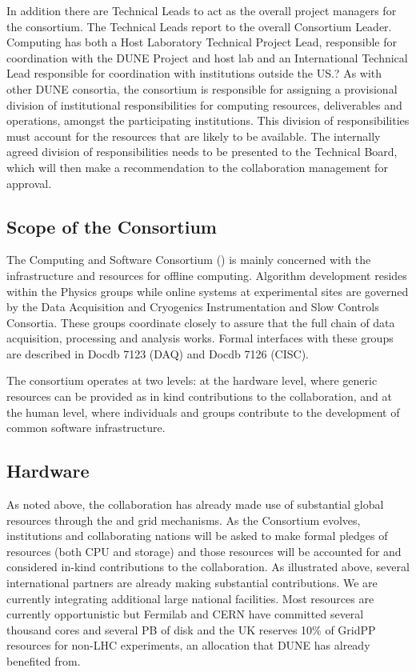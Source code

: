   In addition there  are Technical Leads to act as the overall project managers for the consortium. The Technical Leads report to the overall Consortium Leader.
  Computing has both a Host Laboratory Technical Project Lead, responsible for coordination with the DUNE Project and host lab and an International Technical Lead responsible for coordination with institutions outside the US.?
  As with other DUNE consortia, the consortium is responsible for assigning a provisional division of institutional
  responsibilities for computing resources, deliverables and operations, amongst the participating institutions. This division of responsibilities must account for the resources that are likely to be available. The internally agreed division of responsibilities needs to be presented to the Technical Board, which will then make a recommendation to the collaboration management for approval.



  \subsection{Scope of the Consortium}
  The Computing and Software Consortium () is mainly concerned with the infrastructure and resources for offline computing.  Algorithm development resides within the Physics groups while online systems at experimental sites are governed by the Data Acquisition and Cryogenics Instrumentation and Slow Controls Consortia. These groups coordinate closely to assure that the full chain of data acquisition, processing and analysis works. Formal interfaces with these groups are described in Docdb 7123 (DAQ) and Docdb 7126 (CISC).

  The consortium operates at two levels: at the hardware level, where generic resources can be provided as in kind contributions to the collaboration, and at the human level, where individuals and groups contribute to the development of common software infrastructure.

  \subsection{Hardware}
  As noted above, the collaboration has already made use of substantial global resources through the  and  grid mechanisms. As the Consortium evolves, institutions and collaborating nations will be asked to make formal pledges of resources (both CPU and storage) and those resources will be accounted for and considered in-kind contributions to the collaboration.
  As illustrated above, several international partners are already making substantial contributions. We are currently integrating additional large national facilities. Most resources are currently opportunistic but Fermilab and CERN have committed several thousand cores and several PB of disk and the UK reserves 10\% of GridPP resources for non-LHC experiments, an allocation that DUNE has already benefited from.

